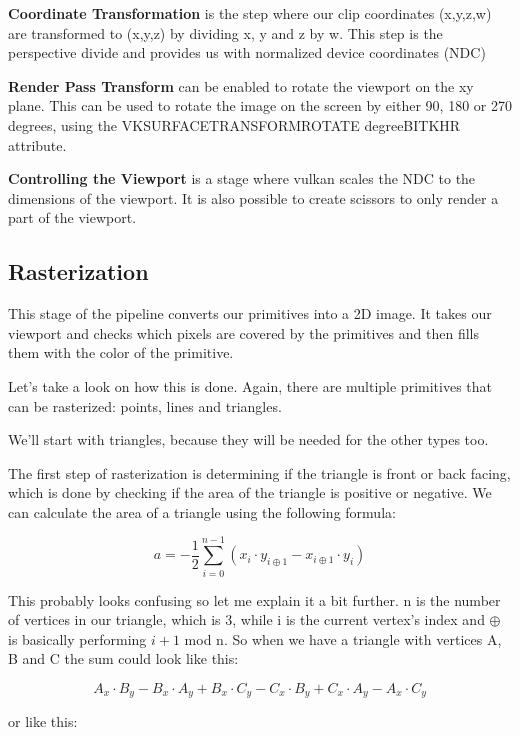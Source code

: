 \documentclass[12pt]{report} \usepackage{preamble}
\begin{document}
\textbf{Coordinate Transformation} is the step where our clip coordinates (x,y,z,w)
are transformed to (x,y,z) by dividing x, y and z by w.
This step is the perspective divide and provides us with
normalized device coordinates (NDC) \cite{vertex-post-processing}

\textbf{Render Pass Transform} can be enabled to rotate the viewport on the xy plane.
This can be used to rotate the image on the screen by either 90, 180 or 270 degrees, using the
VK\textunderscore SURFACE\textunderscore TRANSFORM\textunderscore ROTATE\textunderscore
{degree}\textunderscore BIT\textunderscore KHR attribute. \cite{vertex-post-processing}

\textbf{Controlling the Viewport} is a stage where vulkan scales the NDC
to the dimensions of the viewport. It is also possible to create
scissors to only render a part of the viewport.

\subsection{Rasterization}

This stage of the pipeline converts our primitives into a 2D image.
It takes our viewport and checks which pixels are covered by the
primitives and then fills them with the color of the primitive.

Let's take a look on how this is done. Again, there are multiple primitives that can be rasterized:
points, lines and triangles.

We'll start with triangles, because they will be needed for the other types too.

The first step of rasterization is determining if the triangle is front or back facing,
which is done by checking if the area of the triangle is positive or negative.
We can calculate the area of a triangle using the following formula:

\[
	a = -\frac{1}{2} \sum_{i=0}^{n-1} (x_i \cdot y_{i\oplus 1} - x_{i\oplus 1} \cdot y_i)
\]

This probably looks confusing so let me explain it a bit further.
n is the number of vertices in our triangle, which is 3, while i is the current
vertex's index and \(\oplus\) is basically performing \( i+1\) mod n.
So when we have a triangle with vertices A, B and C the sum could look like this:

\[A_x \cdot B_y - B_x \cdot A_y + B_x \cdot C_y - C_x \cdot B_y + C_x \cdot A_y - A_x \cdot C_y\]

or like this:
\end{document}
